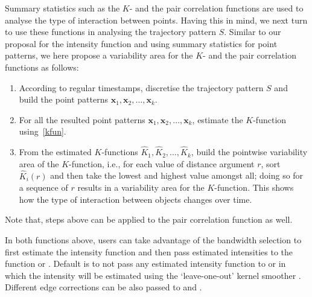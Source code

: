 \documentclass[article]{jss}
\begin{document}
Summary statistics such as the $K$- and the pair correlation functions are used to analyse the type of interaction between points. Having this in mind, we next turn to use these functions in analysing the trajectory pattern $S$. Similar to our proposal for the intensity function and using summary statistics for point patterns, we here propose a variability area for the $K$- and the pair correlation functions as follows:
  \begin{leftbar}
  \begin{enumerate}
  \item According to regular timestamps, discretise the trajectory pattern $S$ and build the point patterns $\mathbf{x}_1,\mathbf{x}_2, \ldots, \mathbf{x}_k$.
  \item For all the resulted point patterns $\mathbf{x}_1,\mathbf{x}_2, \ldots, \mathbf{x}_k$, estimate the $K$-function using~\ref{kfun}.
  \item From the estimated $K$-functions $\widehat{K}_1, \widehat{K}_2,\ldots,\widehat{K}_k$, build the pointwise variability area of the $K$-function, i.e., for each value of distance argument $r$, sort $\widehat{K}_i(r)$ and then take the lowest and highest value amongst all; doing so for a sequence of $r$ results in a variability area for the $K$-function. This shows how the type of interaction between objects changes over time.
  \end{enumerate}
  \end{leftbar}

Note that, steps above can be applied to the pair correlation function as well.

In both functions above, users can take advantage of the bandwidth selection to first estimate the intensity function and then pass estimated intensities to the function  or . Default is to not pass any estimated intensity function to  or  in which the intensity will be estimated using the `leave-one-out' kernel smoother \citep{baddeley00,BRT15}. Different edge corrections can be also passed to  and . 
  
\end{document}
